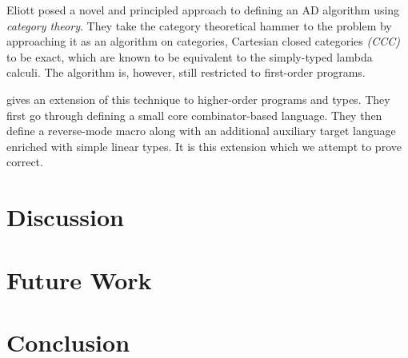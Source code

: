 \documentclass[11pt, final]{article}
\begin{document}
  Eliott posed a novel and principled approach to defining an AD algorithm using \textit{category theory}\cite{Elliott-2018-ad-icfp}.
  They take the category theoretical hammer to the problem by approaching it as an algorithm on categories, Cartesian closed categories \textit{(CCC)} to be exact, which are known to be equivalent to the simply-typed lambda calculi\cite{Elliott-2017-compiling-to-categories}\cite{10.1007/3-540-15198-2_10}.
  The algorithm is, however, still restricted to first-order programs.

  \Vakar{} gives an extension of this technique to higher-order programs and types\cite{vkr2020reverse}.
  They first go through defining a small core combinator-based language.
  They then define a reverse-mode macro along with an additional auxiliary target language enriched with simple linear types.
  It is this extension which we attempt to prove correct.
  
  
  
\section{Discussion}
  
\section{Future Work}
  
\section{Conclusion}
  

\clearpage
\printbibliography
\makeatother
\end{document}
